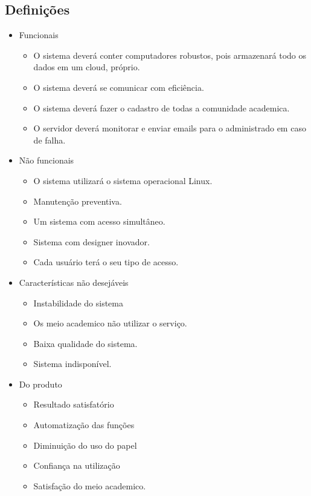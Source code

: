      \subsection{Definições}
       \begin{itemize}
        \item Funcionais
           \begin{itemize}
            \item O sistema deverá conter computadores robustos, pois armazenará todo os dados em um cloud, próprio.
            \item O sistema deverá se comunicar com eficiência.
            \item O sistema deverá fazer o cadastro de todas a comunidade academica.
            \item O servidor deverá monitorar e enviar emails para o administrado em caso de falha.
           \end{itemize}
           
         \item Não funcionais
           \begin{itemize}
            \item O sistema utilizará o sistema operacional Linux.
            \item Manutenção preventiva.
            \item Um sistema com acesso simultâneo.
            \item Sistema com designer inovador.
            \item Cada usuário terá o seu tipo de acesso.
           \end{itemize}

        \item Características não desejáveis
	 \begin{itemize}
	  \item Instabilidade do sistema
	  \item Os meio academico não utilizar o serviço.
	  \item Baixa qualidade do sistema.
	  \item Sistema indisponível.
	 \end{itemize}
	 
	 \item Do produto
	 \begin{itemize}
	  \item Resultado satisfatório
	  \item Automatização das funções
	  \item Diminuição do uso do papel
	  \item Confiança na utilização
	  \item Satisfação do meio academico.
	 \end{itemize} 
	 

\end{itemize}
